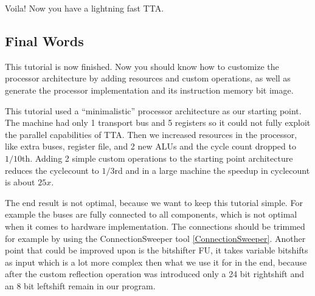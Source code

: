 \documentclass[a4paper,twoside]{tceusermanual}
\begin{document}



Voila! Now you have a lightning fast TTA. %

\subsection{Final Words}

This tutorial is now finished. Now you should know how to customize
the processor architecture by adding resources and custom operations,
as well as generate the processor implementation and its instruction
memory bit image.

This tutorial used a ``minimalistic'' processor architecture as our
starting point. The machine had only 1 transport bus and 5 registers
so it could not fully exploit the parallel capabilities of TTA.  Then
we increased resources in the processor, like extra buses, register file,
and 2 new ALUs and the cycle count dropped to $1/10$th. 
Adding 2 simple custom operations to the starting point architecture 
reduces the cyclecount to $1/3$rd and in a large machine the speedup
in cyclecount is about $25x$.

The end result is not optimal, because we want to keep this tutorial simple. 
For example the buses are fully connected to all components, which is not optimal 
when it comes to hardware implementation. The connections should be trimmed 
for example by using the ConnectionSweeper tool \ref{ConnectionSweeper}. Another point that could be 
improved upon is the bitshifter FU, it takes variable bitshifts as input 
which is a lot more complex then what we use it for in the end, because after 
the custom reflection operation was introduced only a 24 bit rightshift and an 
8 bit leftshift remain in our program.

 
\end{document}
